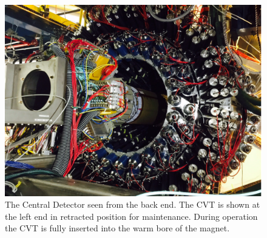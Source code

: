 \documentclass[final,3p,twocolumn]{elsarticle}
\begin{document}
\begin{figure}[htbp!]
\centerline{\includegraphics[width=1.0\columnwidth]{CLAS12-CD.png}}
\caption{The Central Detector seen from the back end. The CVT is shown at the left end in 
retracted position for maintenance.
During operation the CVT is  fully inserted into the warm bore of the magnet.  }
\label{CDback}
\end{figure}


\end{document}
